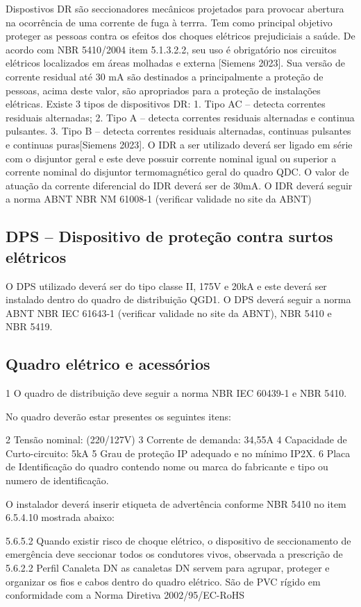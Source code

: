 Dispostivos DR são seccionadores mecânicos projetados para provocar abertura na ocorrência de uma corrente de fuga à terrra. Tem como principal objetivo proteger as pessoas contra os efeitos dos choques elétricos prejudiciais a saúde. De acordo com NBR 5410/2004 item 5.1.3.2.2, seu uso é obrigatório nos circuitos elétricos localizados em áreas molhadas e externa [Siemens 2023].
Sua versão de corrente residual até 30 mA são destinados a principalmente a proteção de pessoas, acima deste valor, são apropriados para a proteção de instalações elétricas. Existe 3 tipos de dispositivos DR:
    1. Tipo AC – detecta correntes residuais alternadas;
    2. Tipo A – detecta correntes residuais alternadas e continua pulsantes.
    3. Tipo B – detecta correntes residuais alternadas, continuas pulsantes e continuas puras[Siemens 2023].
O IDR a ser utilizado deverá ser ligado em série com o disjuntor geral e este deve possuir corrente nominal igual ou superior a corrente nominal do disjuntor termomagnético geral do quadro QDC. O valor de atuação da corrente diferencial do IDR deverá ser de 30mA. O IDR deverá seguir a norma ABNT NBR NM 61008-1 (verificar validade no site da ABNT)
\subsection{DPS – Dispositivo de proteção contra surtos elétricos}
O DPS utilizado deverá ser do tipo classe II, 175V e 20kA e este deverá ser instalado dentro do quadro de distribuição QGD1. O DPS deverá seguir a norma ABNT NBR IEC 61643-1 (verificar validade no site da ABNT), NBR 5410 e NBR 5419.

\subsection{Quadro elétrico e acessórios}
    1 O quadro de distribuição deve seguir a norma NBR IEC 60439-1 e NBR 5410.

No quadro deverão estar presentes os seguintes itens:

    2 Tensão nominal: (220/127V)
    3 Corrente de demanda: 34,55A 
    4 Capacidade de Curto-circuito: 5kA
    5 Grau de proteção IP adequado e no mínimo IP2X.
    6 Placa de Identificação do quadro contendo nome ou marca do fabricante e tipo ou numero de identificação.

O instalador deverá inserir etiqueta de advertência conforme NBR 5410 no item 6.5.4.10 mostrada abaixo:

5.6.5.2 Quando existir risco de choque elétrico, o dispositivo de seccionamento de emergência deve seccionar todos os condutores vivos, observada a prescrição de 5.6.2.2
Perfil 
Canaleta DN
as canaletas DN servem para agrupar, proteger e organizar os fios e cabos dentro do quadro elétrico. São de PVC rígido em conformidade com a Norma Diretiva 2002/95/EC-RoHS